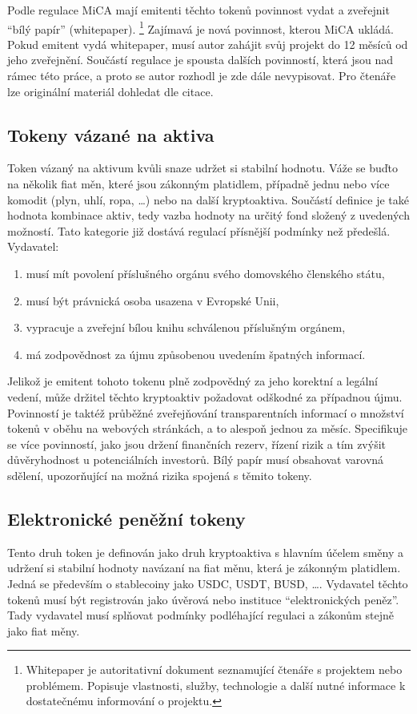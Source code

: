 Podle regulace MiCA mají emitenti těchto tokenů povinnost vydat a zveřejnit \enquote{bílý papír} (whitepaper).
\footnote{Whitepaper je autoritativní dokument seznamující čtenáře s projektem nebo problémem. Popisuje vlastnosti, služby, technologie a další nutné informace k dostatečnému informování o projektu.}
Zajímavá je nová povinnost,
kterou MiCA ukládá. Pokud emitent vydá whitepaper, musí autor zahájit svůj projekt do 12 měsíců od jeho zveřejnění. Součástí regulace je spousta dalších povinností, která jsou nad rámec
této práce, a proto se autor rozhodl je zde dále nevypisovat. Pro čtenáře lze originální materiál dohledat dle citace.

\subsection{Tokeny vázané na aktiva}
Token vázaný na aktivum kvůli snaze udržet si stabilní hodnotu. Váže se buďto na několik fiat měn, které jsou zákonným platidlem, případně jednu nebo více komodit (plyn, uhlí, ropa, \ldots)
nebo na další kryptoaktiva. Součástí definice je také hodnota kombinace aktiv, tedy vazba hodnoty na určitý fond složený z uvedených možností. Tato kategorie již dostává regulací přísnější
podmínky než předešlá. Vydavatel:
\begin{enumerate}
    \item musí mít povolení příslušného orgánu svého domovského členského státu,
    \item musí být právnická osoba usazena v Evropské Unii,
    \item vypracuje a zveřejní bílou knihu schválenou příslušným orgánem,
    \item má zodpovědnost za újmu způsobenou uvedením špatných informací.
\end{enumerate}
Jelikož je emitent tohoto tokenu plně zodpovědný za jeho korektní a legální vedení, může držitel těchto kryptoaktiv požadovat odškodné za případnou újmu. Povinností je taktéž
průběžné zveřejňování transparentních informací o množství tokenů v oběhu na webových stránkách, a to alespoň jednou za měsíc. Specifikuje se více povinností, jako jsou držení
finančních rezerv, řízení rizik a tím zvýšit důvěryhodnost u potenciálních investorů. Bílý papír musí obsahovat varovná sdělení, upozorňující na možná rizika spojená s těmito
tokeny.

\subsection{Elektronické peněžní tokeny}
Tento druh token je definován jako druh kryptoaktiva s hlavním účelem směny a udržení si stabilní hodnoty navázaní na fiat měnu, která je zákonným platidlem. Jedná se především o stablecoiny
jako USDC, USDT, BUSD, \ldots. Vydavatel těchto tokenů musí být registrován jako úvěrová nebo instituce \enquote{elektronických peněz}. Tady vydavatel musí splňovat podmínky
podléhající regulaci a zákonům stejně jako fiat měny.

\endinput